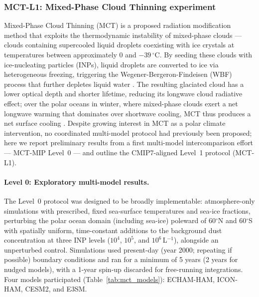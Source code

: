 %
%

\subsubsection{MCT-L1: Mixed-Phase Cloud Thinning experiment}
\label{sec:mct}

Mixed-Phase Cloud Thinning (MCT) is a proposed radiation
modification method that exploits the thermodynamic instability of
mixed-phase clouds — clouds containing supercooled liquid droplets coexisting
with ice crystals at temperatures between approximately 0 and $-39\,^\circ$C.
By seeding these clouds with ice-nucleating particles (INPs), liquid droplets
are converted to ice via heterogeneous freezing, triggering the
Wegener-Bergeron-Findeisen (WBF) process that further depletes liquid water
\citep{Villanueva2025Science}.
The resulting glaciated cloud has a lower optical depth and shorter lifetime,
reducing its longwave cloud radiative effect; over the polar oceans in winter,
where mixed-phase clouds exert a net longwave warming that dominates over
shortwave cooling, MCT thus produces a net surface cooling
\citep{Villanueva2022ERL}.
Despite growing interest in MCT as a polar climate intervention, no
coordinated multi-model protocol had previously been proposed; here we report
preliminary results from a first multi-model intercomparison effort —
MCT-MIP Level~0 — and outline the CMIP7-aligned Level~1 protocol (MCT-L1).

\paragraph{Level 0: Exploratory multi-model results.}

The Level~0 protocol was designed to be broadly implementable: atmosphere-only
simulations with prescribed, fixed sea-surface temperatures and sea-ice
fractions, perturbing the polar ocean domain (including sea-ice) poleward of 60$^\circ$N and
60$^\circ$S with spatially uniform, time-constant additions to the background
dust concentration at three INP levels ($10^4$, $10^5$, and $10^6$\,L$^{-1}$),
alongside an unperturbed control.
Simulations used present-day (year 2000; repeating if possible) boundary conditions and ran for a
minimum of 5 years (2 years for nudged models), with a 1-year spin-up
discarded for free-running integrations.
Four models participated (Table~\ref{tab:mct_models}): ECHAM-HAM, ICON-HAM,
CESM2, and E3SM.

